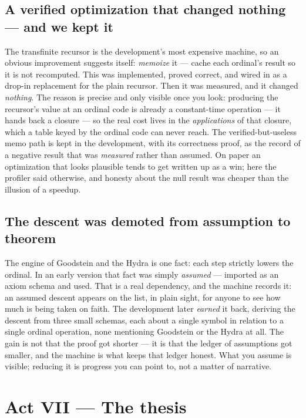 \documentclass[11pt]{article}
\begin{document}
\subsection*{A verified optimization that changed nothing --- and we kept it}

The transfinite recursor is the development's most expensive machine, so an
obvious improvement suggests itself: \emph{memoize} it --- cache each ordinal's
result so it is not recomputed. This was implemented, proved correct, and wired
in as a drop-in replacement for the plain recursor. Then it was measured, and it
changed \emph{nothing}. The reason is precise and only visible once you look:
producing the recursor's value at an ordinal code is already a constant-time
operation --- it hands back a closure --- so the real cost lives in the
\emph{applications} of that closure, which a table keyed by the ordinal code can
never reach. The verified-but-useless memo path is kept in the development, with
its correctness proof, as the record of a negative result that was
\emph{measured} rather than assumed. On paper an optimization that looks
plausible tends to get written up as a win; here the profiler said otherwise, and
honesty about the null result was cheaper than the illusion of a speedup.

\subsection*{The descent was demoted from assumption to theorem}

The engine of Goodstein and the Hydra is one fact: each step strictly lowers the
ordinal. In an early version that fact was simply \emph{assumed} --- imported as
an axiom schema and used. That is a real dependency, and the machine records it:
an assumed descent appears on the  list, in plain sight,
for anyone to see how much is being taken on faith. The development later
\emph{earned} it back, deriving the descent from three small schemas, each about
a single symbol in relation to a single ordinal operation, none mentioning
Goodstein or the Hydra at all. The gain is not that the proof got shorter --- it
is that the ledger of assumptions got smaller, and the machine is what keeps that
ledger honest. What you assume is visible; reducing it is progress you can point
to, not a matter of narrative.

\section{Act VII --- The thesis}
\end{document}
